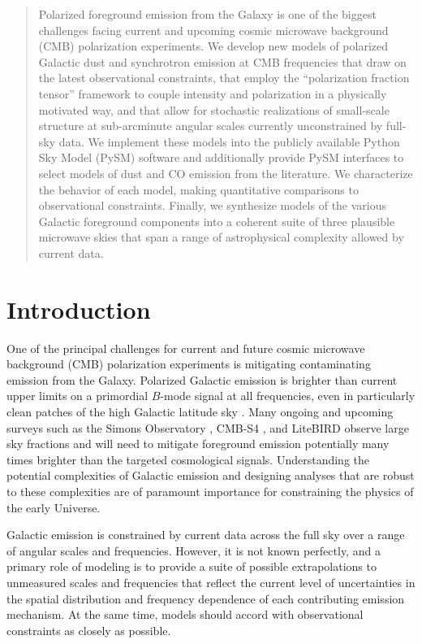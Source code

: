 \documentclass[twocolumn]{aastex631}
\begin{document}

\date{\today}

\begin{abstract}
Polarized foreground emission from the Galaxy is one of the biggest challenges facing current and upcoming cosmic microwave background (CMB) polarization experiments. We develop new models of polarized Galactic dust and synchrotron emission at CMB frequencies that draw on the latest observational constraints, that employ the ``polarization fraction tensor'' framework to couple intensity and polarization in a physically motivated way, and that allow for stochastic realizations of small-scale structure at sub-arcminute angular scales currently unconstrained by full-sky data. We implement these models into the publicly available Python Sky Model (PySM) software and additionally provide PySM interfaces to select models of dust and CO emission from the literature. We characterize the behavior of each model, making quantitative comparisons to observational constraints. Finally, we synthesize models of the various Galactic foreground components into a coherent suite of three plausible microwave skies that span a range of astrophysical complexity allowed by current data.
\end{abstract}

\section{Introduction}
One of the principal challenges for current and future cosmic microwave background (CMB) polarization experiments is mitigating contaminating emission from the Galaxy. Polarized Galactic emission is brighter than current upper limits on a primordial $B$-mode signal at all frequencies, even in particularly clean patches of the high Galactic latitude sky \citep{planck2016-l11A, Ade:2021}. Many ongoing and upcoming surveys such as the Simons Observatory \citep{Ade:2019}, CMB-S4 \citep{Abazajian:2022}, and LiteBIRD \citep{LiteBIRDCollaboration:2023} observe large sky fractions and will need to mitigate foreground emission potentially many times brighter than the targeted cosmological signals. Understanding the potential complexities of Galactic emission and designing analyses that are robust to these complexities are of paramount importance for constraining the physics of the early Universe.

Galactic emission is constrained by current data across the full sky over a range of angular scales and frequencies. However, it is not known perfectly, and a primary role of modeling is to provide a suite of possible extrapolations to unmeasured scales and frequencies that reflect the current level of uncertainties in the spatial distribution and frequency dependence of each contributing emission mechanism. At the same time, models should accord with observational constraints as closely as possible.
\end{document}
